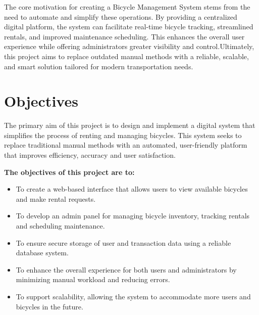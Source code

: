 \noindent The core motivation for creating a Bicycle Management System stems from the need to automate and simplify these operations. By providing a centralized digital platform, the system can facilitate real-time bicycle tracking, streamlined rentals, and improved maintenance scheduling. This enhances the overall user experience while offering administrators greater visibility and control.Ultimately, this project aims to replace outdated manual methods with a reliable, scalable, and smart solution tailored for modern transportation needs.\cite{1.2}

\section{Objectives}
The primary aim of this project is to design and implement a digital system that simplifies the process of renting and managing bicycles. This system seeks to replace traditional manual methods with an automated, user-friendly platform that improves efficiency, accuracy and user satisfaction.
\item \textbf{The objectives of this project are to:}
\begin{itemize}
\item To create a web-based interface that allows users to view available bicycles and make rental requests.
\item To develop an admin panel for managing bicycle inventory, tracking rentals and scheduling maintenance.
\item To ensure secure storage of user and transaction data using a reliable database system.
\item To enhance the overall experience for both users and administrators by minimizing manual workload and reducing errors.
\item To support scalability, allowing the system to accommodate more users and bicycles in the future.\cite{1.3}
\end{itemize}

